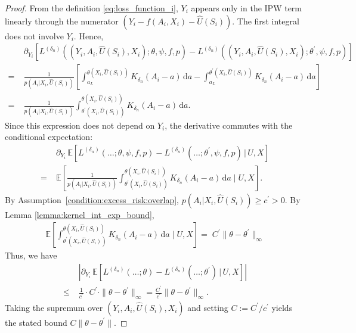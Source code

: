 \documentclass[12pt]{article}
\newcommand{\E}{\mathbb{E}}
\begin{document}
\begin{proof}
From the definition \eqref{eq:loss_function_i}, $Y_i$ appears only in the IPW term linearly through the numerator $(Y_i - f(A_i,X_i) - \widehat U(S_i))$. The first integral does not involve $Y_i$. Hence,
\begin{align*}
    &\partial_{Y_i}\left[L^{(\delta_n)}((Y_i,A_i,\widehat U(S_i),X_i);\theta,\psi,f,p) - L^{(\delta_n)}((Y_i,A_i,\widehat U(S_i),X_i);\theta^\prime,\psi,f,p)\right]\\
    =\;&\frac{1}{p(A_i|X_i,\widehat U(S_i))}\left[\int_{a_L}^{\theta(X_i,\widehat U(S_i))}K_{\delta_n}(A_i-a)\,\mathrm{d}a - \int_{a_L}^{\theta^\prime(X_i,\widehat U(S_i))}K_{\delta_n}(A_i-a)\,\mathrm{d}a\right]\\
    =\;&\frac{1}{p(A_i|X_i,\widehat U(S_i))}\int_{\theta^\prime(X_i,\widehat U(S_i))}^{\theta(X_i,\widehat U(S_i))}K_{\delta_n}(A_i-a)\,\mathrm{d}a.
\end{align*}
Since this expression does not depend on $Y_i$, the derivative commutes with the conditional expectation:
\begin{align*}
    &\partial_{Y_i}\,\E\!\left[L^{(\delta_n)}(\ldots;\theta,\psi,f,p) - L^{(\delta_n)}(\ldots;\theta^\prime,\psi,f,p)\,\Big|\,U,X\right]\\
    =\;&\E\!\left[\frac{1}{p(A_i|X_i,\widehat U(S_i))}\int_{\theta^\prime(X_i,\widehat U(S_i))}^{\theta(X_i,\widehat U(S_i))}K_{\delta_n}(A_i-a)\,\mathrm{d}a\;\Bigg|\;U,X\right].
\end{align*}
By Assumption~\ref{condition:excess_risk:overlap}, $p(A_i|X_i,\widehat U(S_i))\geq c^\prime>0$. By Lemma \ref{lemma:kernel_int_exp_bound},
\begin{align*}
\E\!\left[\int_{\theta^\prime(X_i,\widehat U(S_i))}^{\theta(X_i,\widehat U(S_i))}K_{\delta_n}(A_i-a)\,\mathrm{d}a\;\Bigg|\;U,X\right]
    =\; C^\prime \|\theta-\theta^\prime\|_\infty\label{eq:kernel_int_diff_exp}
\end{align*}
Thus, we have 
\begin{align*}
    &\left|\partial_{Y_i}\,\E\!\left[L^{(\delta_n)}(\ldots;\theta) - L^{(\delta_n)}(\ldots;\theta^\prime)\,\big|\,U,X\right]\right|\\
    \leq\;&\frac{1}{c^\prime}\cdot C^\prime\cdot\|\theta-\theta^\prime\|_\infty = \frac{C^\prime}{c^\prime}\|\theta-\theta^\prime\|_\infty.
\end{align*}
Taking the supremum over $(Y_i,A_i,\widehat U(S_i),X_i)$ and setting $C:=C^\prime/c^\prime$ yields the stated bound $C\|\theta-\theta^\prime\|$.
\end{proof}
\end{document}
